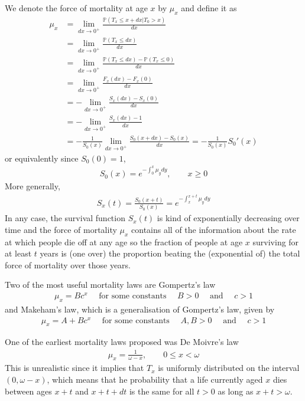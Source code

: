 \documentclass[hidelinks, 12pt]{article}
\theoremstyle{mydefstyle}
\theoremstyle{mythmstyle}
\newcounter{prop}
\begin{document}
We denote the force of mortality at age $x$ by $\mu_x$ and define it as
\begin{align*}
\mu_x 
&= \lim_{dx \to 0^+} \frac{\mathbb{P}(T_x \le x + dx \vert T_0 > x)}{dx} \\
&= \lim_{dx \to 0^+} \frac{\mathbb{P}(T_x \le dx)}{dx} \\
&= \lim_{dx \to 0^+} \frac{\mathbb{P}(T_x \le dx) - \mathbb{P}(T_x \le 0)}{dx} \\
&= \lim_{dx \to 0^+} \frac{F_x(dx) - F_x(0)}{dx} \\
&= - \lim_{dx \to 0^+} \frac{S_x(dx) - S_x(0)}{dx} \\
&= - \lim_{dx \to 0^+} \frac{S_x(dx) - 1}{dx} \\
&= - \frac{1}{S_0(x)} \lim_{dx \to 0^+} \frac{S_0(x+dx) - S_0(x)}{dx} = -\frac{1}{S_0(x)} S_0'(x)
\end{align*}
or equivalently since $S_0(0) = 1$, 
\begin{gather*}
S_0(x) = e^{-\int_0^x \mu_y dy}, \qquad x \ge 0
\end{gather*}
More generally,
\begin{gather*}
S_x(t) = \frac{S_0(x+t)}{S_0(x)} = e^{-\int_x^{x+t} \mu_y dy}
\end{gather*}
In any case, the survival function $S_x(t)$ is kind of exponentially decreasing over time and the force of mortality $\mu_x$ contains all of the information about the rate at which people die off at any age so the fraction of people at age $x$ surviving for at least $t$ years is (one over) the proportion beating the (exponential of) the total force of mortality over those years. 

Two of the most useful mortality laws are Gompertz's law
\begin{gather*}
\mu_x = Bc^x \quad\mbox{ for some constants }\quad B > 0 \quad\mbox{ and }\quad c > 1
\end{gather*}
and Makeham's law, which is a generalisation of Gompertz's law, given by
\begin{gather*}
\mu_x = A + Bc^x \quad\mbox{ for some constants }\quad A, B > 0 \quad\mbox{ and }\quad c > 1
\end{gather*}

One of the earliest mortality laws proposed was De Moivre's law
\begin{gather*}
\mu_x = \frac{1}{\omega - x}, \qquad 0 \le x < \omega
\end{gather*}
This is unrealistic since it implies that $T_x$ is uniformly distributed on the interval $(0, \omega - x)$, which means that he probability that a life currently aged $x$ dies between ages $x+t$ and $x+t+dt$ is the same for all $t > 0$ as long as $x+t > \omega$. 
\end{document}

